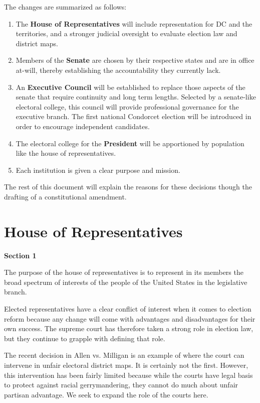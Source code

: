 \documentclass{article}
\begin{document}
The changes are summarized as follows:
\begin{enumerate}
  \item The \textbf{House of Representatives} will include representation for DC and the territories, and a stronger judicial oversight to evaluate election law and district maps.
  \item Members of the \textbf{Senate} are chosen by their respective states and are in office at-will, thereby establishing the accountability they currently lack.
  \item An \textbf{Executive Council} will be established to replace those aspects of the senate that require continuity and long term lengths. Selected by a senate-like electoral college, this council will provide professional governance for the executive branch. The first national Condorcet election will be introduced in order to encourage independent candidates.
  \item The electoral college for the \textbf{President} will be apportioned by population like the house of representatives.
 \item Each institution is given a clear purpose and mission.
\end{enumerate}

The rest of this document will explain the reasons for these decisions though the drafting of a constitutional amendment.

\section{House of Representatives}

\begin{quoting}
\textbf{Section 1}

The purpose of the house of representatives is to represent in its members the broad spectrum of interests of the people of the United States in the legislative branch.
\end{quoting}

Elected representatives have a clear conflict of interest when it comes to election reform because any change will come with advantages and disadvantages for their own success. The supreme court has therefore taken a strong role in election law, but they continue to grapple with defining that role.

The recent decision in Allen vs. Milligan\cite{Allen_Milligan} is an example of where the court can intervene in unfair electoral district maps. It is certainly not the first. However, this intervention has been fairly limited\cite{Brewer} because while the courts have legal basis to protect against racial gerrymandering, they cannot do much about unfair partisan advantage. We seek to expand the role of the courts here.
\end{document}
